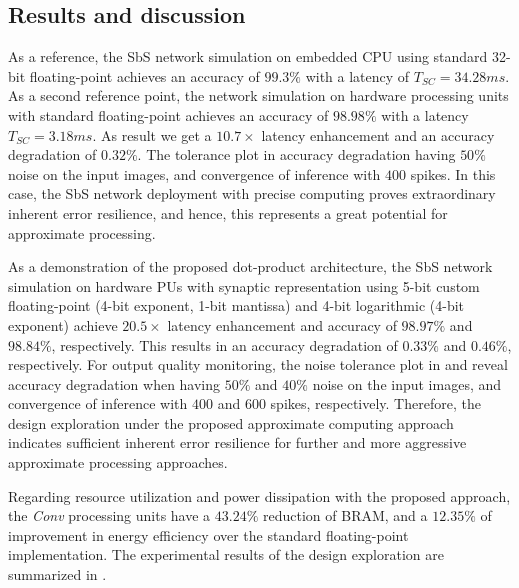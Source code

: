 \subsection{Results and discussion}
As a reference, the SbS network simulation on embedded CPU using standard 32-bit floating-point achieves an accuracy of $99.3\%$ with a latency of $T_{SC} = 34.28ms$. As a second reference point, the network simulation on hardware processing units with standard floating-point achieves an accuracy of $98.98\%$ with a latency $T_{SC}=3.18ms$. As result we get a $10.7\times$ latency enhancement and an accuracy degradation of $0.32\%$. The tolerance plot in   accuracy degradation having $50\%$ noise on the input images, and convergence of inference with $400$ spikes. In this case, the SbS network deployment with precise computing proves extraordinary inherent error resilience, and hence, this represents a great potential for approximate processing.

As a demonstration of the proposed dot-product architecture, the SbS network simulation on hardware PUs with synaptic representation using 5-bit custom floating-point (4-bit exponent, 1-bit mantissa) and 4-bit logarithmic (4-bit exponent) achieve $20.5\times$ latency enhancement and accuracy of $98.97\%$ and $98.84\%$, respectively. This results in an accuracy degradation of $0.33\%$ and $0.46\%$, respectively. For output quality monitoring, the noise tolerance plot in  and  reveal accuracy degradation when having $50\%$ and $40\%$ noise on the input images, and convergence of inference with $400$ and $600$ spikes, respectively. Therefore, the design exploration under the proposed approximate computing approach indicates sufficient inherent error resilience for further and more aggressive approximate processing approaches.

Regarding resource utilization and power dissipation with the proposed approach, the \emph{Conv} processing units have a $43.24\%$ reduction of BRAM, and a $12.35\%$ of improvement in energy efficiency over the standard floating-point implementation.  The experimental results of the design exploration are summarized in . 

